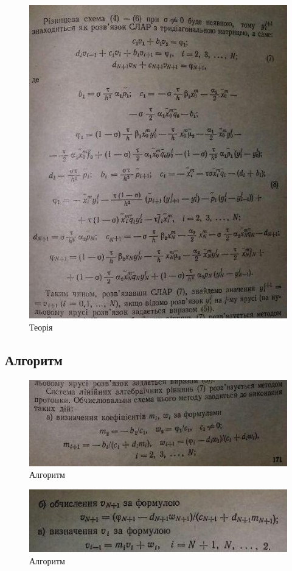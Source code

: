\documentclass[fontsize=14pt,DIV=1,a4paper]{scrartcl}
\begin{document}
	\begin{figure}[h!]
		\includegraphics[scale=1.3]{th_ii3.jpg}
		\centering
		\caption{Теорія}
	\end{figure}
	
	\newpage
	\textbf{}
			
	\newpage
	\subsection{Алгоритм}
	
	\begin{figure}[h!]
		\includegraphics[scale=1.25]{algo_ii1.jpg}
		\centering
		\caption{Алгоритм}
	\end{figure}
	\begin{figure}[h!]
		\includegraphics[scale=1.4]{algo_ii2.jpg}
		\centering
		\caption{Алгоритм}
	\end{figure}
	
\end{document}
